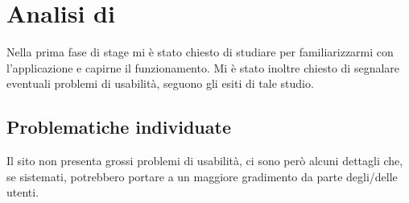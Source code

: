 \section{Analisi  di \fiscoloWeb}\label{usabilita-fiscolo}

Nella prima fase di stage mi è stato chiesto di studiare \fiscoloWeb{} per
familiarizzarmi con l'applicazione e capirne il funzionamento. Mi è stato
inoltre chiesto di segnalare eventuali problemi di usabilità, seguono gli esiti
di tale studio.

\subsection{Problematiche individuate}
Il sito non presenta grossi problemi di usabilità, ci sono però alcuni dettagli che,
se sistemati, potrebbero portare a un maggiore gradimento da parte degli/delle utenti.

